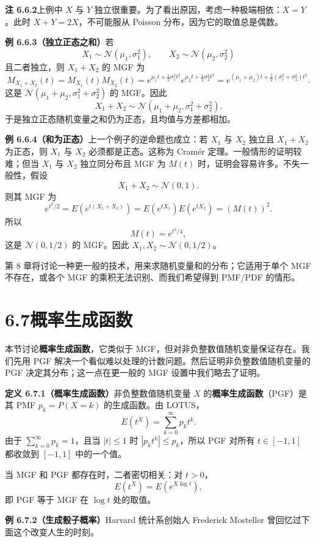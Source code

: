 \documentclass[UTF8,12pt,a4paper,fontset=fandol]{ctexart}
\begin{document}
\noindent\textbf{注 6.6.2}\quad 上例中 $X$ 与 $Y$ 独立很重要。为了看出原因，考虑一种极端相依：$X=Y$。此时 $X+Y=2X$，不可能服从 Poisson 分布，因为它的取值总是偶数。

\noindent\textbf{例 6.6.3（独立正态之和）}\quad 若
\[
  X_1\sim\mathcal{N}(\mu_1,\sigma_1^2),\qquad
  X_2\sim\mathcal{N}(\mu_2,\sigma_2^2)
\]
且二者独立，则 $X_1+X_2$ 的 MGF 为
\[
  M_{X_1+X_2}(t)
  =
  M_{X_1}(t)M_{X_2}(t)
  =
  e^{\mu_1t+\frac12\sigma_1^2t^2}
  e^{\mu_2t+\frac12\sigma_2^2t^2}
  =
  e^{(\mu_1+\mu_2)t+\frac12(\sigma_1^2+\sigma_2^2)t^2}.
\]
这是 $\mathcal{N}(\mu_1+\mu_2,\sigma_1^2+\sigma_2^2)$ 的 MGF。因此
\[
  X_1+X_2\sim\mathcal{N}(\mu_1+\mu_2,\sigma_1^2+\sigma_2^2).
\]
于是独立正态随机变量之和仍为正态，且均值与方差都相加。

\noindent\textbf{例 6.6.4（和为正态）}\quad 上一个例子的逆命题也成立：若 $X_1$ 与 $X_2$ 独立且 $X_1+X_2$ 为正态，则 $X_1$ 与 $X_2$ 必须都是正态。这称为 Cramér 定理。一般情形的证明较难；但当 $X_1$ 与 $X_2$ 独立同分布且 MGF 为 $M(t)$ 时，证明会容易许多。不失一般性，假设
\[
  X_1+X_2\sim\mathcal{N}(0,1).
\]
则其 MGF 为
\[
  e^{t^2/2}
  =
  E(e^{t(X_1+X_2)})
  =
  E(e^{tX_1})E(e^{tX_2})
  =
  (M(t))^2.
\]
所以
\[
  M(t)=e^{t^2/4},
\]
这是 $\mathcal{N}(0,1/2)$ 的 MGF。因此 $X_1,X_2\sim\mathcal{N}(0,1/2)$。

第 8 章将讨论一种更一般的技术，用来求随机变量和的分布；它适用于单个 MGF 不存在，或各个 MGF 的乘积无法识别、而我们希望得到 PMF/PDF 的情形。

\section*{6.7\quad 概率生成函数}

本节讨论\textbf{概率生成函数}，它类似于 MGF，但对非负整数值随机变量保证存在。我们先用 PGF 解决一个看似难以处理的计数问题。然后证明非负整数值随机变量的 PGF 决定其分布；这一点在更一般的 MGF 设置中我们略去了证明。

\noindent\textbf{定义 6.7.1（概率生成函数）}\quad 非负整数值随机变量 $X$ 的\textbf{概率生成函数}（PGF）是其 PMF $p_k=P(X=k)$ 的生成函数。由 LOTUS，
\[
  E(t^X)=\sum_{k=0}^{\infty}p_kt^k.
\]
由于 $\sum_{k=0}^{\infty}p_k=1$，且当 $|t|\le1$ 时 $|p_kt^k|\le p_k$，所以 PGF 对所有 $t\in[-1,1]$ 都收敛到 $[-1,1]$ 中的一个值。

当 MGF 和 PGF 都存在时，二者密切相关：对 $t>0$，
\[
  E(t^X)=E(e^{X\log t}),
\]
即 PGF 等于 MGF 在 $\log t$ 处的取值。

\noindent\textbf{例 6.7.2（生成骰子概率）}\quad Harvard 统计系创始人 Frederick Mosteller 曾回忆过下面这个改变人生的时刻。
\end{document}
